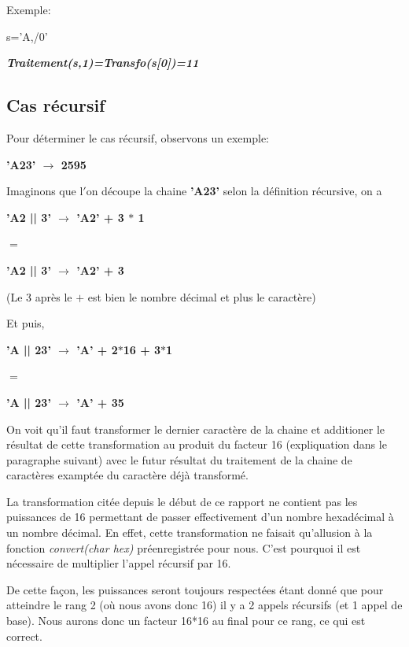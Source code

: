 \documentclass[a4paper, 11pt, oneside]{article}
\begin{document}
Exemple:

\begin{center}
s={'A,/0'}

\textit{\textbf{Traitement(s,1)=Transfo(s[0])=11}}
\end{center}

\subsection{Cas récursif}

Pour déterminer le cas récursif, observons un exemple:

\begin{center}
\textbf{'A23' $\rightarrow$ 2595}
\end{center}

Imaginons que l$'$on découpe la chaine \textbf{'A23'} selon la définition 
récursive, on a

\begin{center}
\textbf{'A2 || 3' $\rightarrow$ 'A2' + 3 $*$ 1}    

$=$

\textbf{'A2 || 3' $\rightarrow$ 'A2' + 3}

(Le 3 après le $+$ est bien le nombre décimal et plus le caractère)
\end{center}

Et puis,

\begin{center}
\textbf{'A || 23' $\rightarrow$ 'A' + 2$*$16 + 3$*$1}

$=$

\textbf{'A || 23' $\rightarrow$ 'A' + 35}
\end{center}

On voit qu'il faut transformer le dernier caractère de la chaine et additioner le 
résultat de cette transformation au produit du facteur 16 (expliquation
dans le paragraphe suivant) avec le futur résultat du traitement de la chaine de 
caractères examptée du caractère déjà transformé.

La transformation citée depuis le début de ce rapport ne contient pas les
puissances de 16 permettant de passer effectivement d'un nombre hexadécimal à un
nombre décimal. En effet, cette transformation ne faisait qu'allusion à la
fonction \textit{convert(char hex)} préenregistrée pour nous. C'est pourquoi il 
est nécessaire de multiplier l'appel récursif par 16. 

De cette façon, les puissances seront toujours respectées étant donné que pour
atteindre le rang 2 (où nous avons donc 16) il y a 2 appels récursifs
(et 1 appel de base). Nous aurons donc un facteur 16*16 au final pour ce rang, ce qui est correct.
\end{document}
